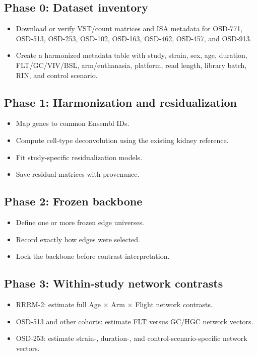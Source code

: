 \documentclass[11pt]{article}
\begin{document}
\subsection*{Phase 0: Dataset inventory}

\begin{itemize}
  \item Download or verify VST/count matrices and ISA metadata for OSD-771,
        OSD-513, OSD-253, OSD-102, OSD-163, OSD-462, OSD-457, and OSD-913.
  \item Create a harmonized metadata table with study, strain, sex, age, duration,
        FLT/GC/VIV/BSL, arm/euthanasia, platform, read length, library batch, RIN,
        and control scenario.
\end{itemize}

\subsection*{Phase 1: Harmonization and residualization}

\begin{itemize}
  \item Map genes to common Ensembl IDs.
  \item Compute cell-type deconvolution using the existing kidney reference.
  \item Fit study-specific residualization models.
  \item Save residual matrices with provenance.
\end{itemize}

\subsection*{Phase 2: Frozen backbone}

\begin{itemize}
  \item Define one or more frozen edge universes.
  \item Record exactly how edges were selected.
  \item Lock the backbone before contrast interpretation.
\end{itemize}

\subsection*{Phase 3: Within-study network contrasts}

\begin{itemize}
  \item RRRM-2: estimate full Age $\times$ Arm $\times$ Flight network contrasts.
  \item OSD-513 and other cohorts: estimate FLT versus GC/HGC network vectors.
  \item OSD-253: estimate strain-, duration-, and control-scenario-specific
        network vectors.
\end{itemize}
\end{document}
